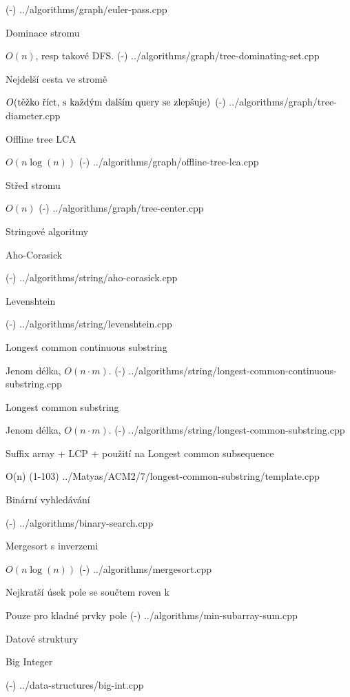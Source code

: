 \verbinput (-) ../algorithms/graph/euler-pass.cpp

\secc Dominace stromu 

$O(n)$, resp takové DFS.
\verbinput (-) ../algorithms/graph/tree-dominating-set.cpp

\secc Nejdelší cesta ve stromě 

$O(\hbox{těžko říct, s každým dalším query se zlepšuje})$
\verbinput (-) ../algorithms/graph/tree-diameter.cpp

\secc Offline tree LCA 

$O(n\log(n))$
\verbinput (-) ../algorithms/graph/offline-tree-lca.cpp

\secc Střed stromu 

$O(n)$
\verbinput (-) ../algorithms/graph/tree-center.cpp

\sec Stringové algoritmy

\secc Aho-Corasick

\verbinput (-) ../algorithms/string/aho-corasick.cpp

\secc Levenshtein 

\verbinput (-) ../algorithms/string/levenshtein.cpp

\secc Longest common continuous substring 

Jenom délka, $O(n \cdot m)$.
\verbinput (-) ../algorithms/string/longest-common-continuous-substring.cpp

\secc Longest common substring 

Jenom délka, $O(n \cdot m)$.
\verbinput (-) ../algorithms/string/longest-common-substring.cpp

\secc Suffix array + LCP + použití na Longest common subsequence 

O(n)
\verbinput (1-103) ../Matyas/ACM2/7/longest-common-substring/template.cpp

\sec Binární vyhledávání 

\verbinput (-) ../algorithms/binary-search.cpp

\sec Mergesort s inverzemi 

$O(n\log(n))$
\verbinput (-) ../algorithms/mergesort.cpp

\sec Nejkratší úsek pole se součtem roven k 

Pouze pro kladné prvky pole
\verbinput (-) ../algorithms/min-subarray-sum.cpp

\newpage

\chap Datové struktury

\sec Big Integer 

\verbinput (-) ../data-structures/big-int.cpp

